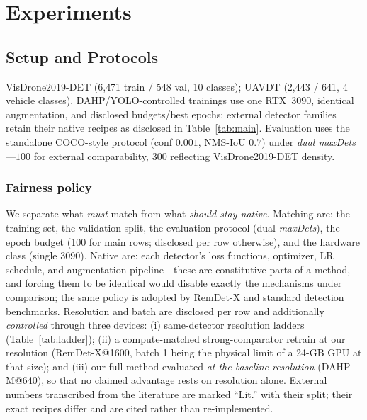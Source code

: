 \documentclass[journal]{IEEEtran}
\newcommand{\remdet}{RemDet-X}
\newcommand{\visdrone}{VisDrone2019-DET}
\newcommand{\uavdt}{UAVDT}
\begin{document}
\section{Experiments}
\label{sec:experiments}
\subsection{Setup and Protocols}
\visdrone{} \cite{visdrone} (6{,}471 train / 548 val, 10 classes); \uavdt{} \cite{uavdt} (2{,}443 / 641, 4 vehicle classes). DAHP/YOLO-controlled trainings use one RTX~3090, identical augmentation, and disclosed budgets/best epochs; external detector families retain their native recipes as disclosed in Table~\ref{tab:main}. Evaluation uses the standalone COCO-style protocol \cite{coco} (conf $0.001$, NMS-IoU $0.7$) under \emph{dual maxDets}---$100$ for external comparability, $300$ reflecting \visdrone{} density.

\subsubsection{Fairness policy}
We separate what \emph{must} match from what \emph{should stay native}. Matching are: the training set, the validation split, the evaluation protocol (dual \emph{maxDets}), the epoch budget (100 for main rows; disclosed per row otherwise), and the hardware class (single 3090). Native are: each detector's loss functions, optimizer, LR schedule, and augmentation pipeline---these are constitutive parts of a method, and forcing them to be identical would disable exactly the mechanisms under comparison; the same policy is adopted by \remdet{} \cite{remdet} and standard detection benchmarks. Resolution and batch are disclosed per row and additionally \emph{controlled} through three devices: (i) same-detector resolution ladders (Table~\ref{tab:ladder}); (ii) a compute-matched strong-comparator retrain at our resolution (\remdet{}@1600, batch 1 being the physical limit of a 24-GB GPU at that size); and (iii) our full method evaluated \emph{at the baseline resolution} (DAHP-M@640), so that no claimed advantage rests on resolution alone. External numbers transcribed from the literature are marked ``Lit.'' with their split; their exact recipes differ and are cited rather than re-implemented.
\end{document}
